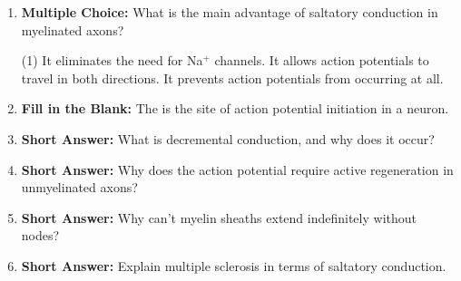 \begin{enumerate}[label=\textbf{Q2.3.\arabic*}]
            \item \textbf{Multiple Choice:} What is the main advantage of saltatory conduction in myelinated axons?
            \begin{tasks}[label=\textcolor{draculafg}{(\Alph*)}, item-format=\color{draculafg}, label-width=1.5em, item-indent=1.7em](1)
                  \task It eliminates the need for Na\(^+\) channels.
                  \task {}
                  \task It allows action potentials to travel in both directions.
                  \task It prevents action potentials from occurring at all.
            \end{tasks}
            
      \item \textbf{Fill in the Blank:} The  is the site of action potential initiation in a neuron. \\

      \item \textbf{Short Answer:} What is decremental conduction, and why does it occur? \\

      \item \textbf{Short Answer:} Why does the action potential require active regeneration in unmyelinated axons? \\

      \item \textbf{Short Answer:} Why can't myelin sheaths extend indefinitely without nodes? \\

      \item \textbf{Short Answer:} Explain multiple sclerosis in terms of saltatory conduction. \\

\end{enumerate}

\squigglyline

